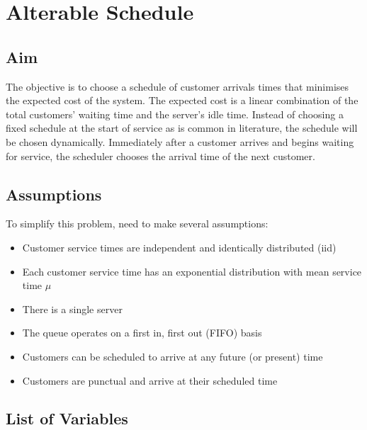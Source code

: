 \chapter{Alterable Schedule}

\section{Aim}

The objective is to choose a schedule of customer arrivals times that minimises the expected cost of the system. The expected cost is a linear combination of the total customers' waiting time and the server's idle time. Instead of choosing a fixed schedule at the start of service as is common in literature, the schedule will be chosen dynamically. Immediately after a customer arrives and begins waiting for service, the scheduler chooses the arrival time of the next customer.

\section{Assumptions}

To simplify this problem, need to make several assumptions:

\begin{itemize}
	\item Customer service times are independent and identically distributed (iid)
	\item Each customer service time has an exponential distribution with mean service time $\mu$
	\item There is a single server
	\item The queue operates on a first in, first out (FIFO) basis
	\item Customers can be scheduled to arrive at any future (or present) time
	\item Customers are punctual and arrive at their scheduled time
\end{itemize}

\section{List of Variables}

